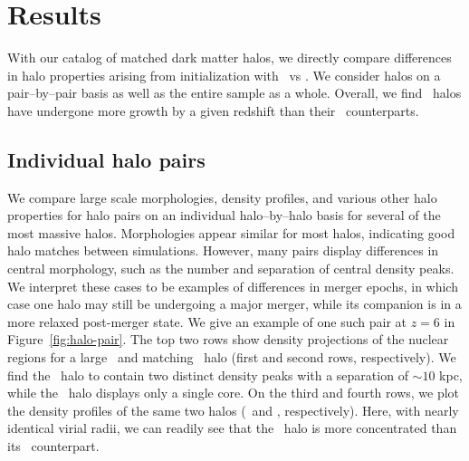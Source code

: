 
%
%

\section{Results}
\label{sec:2lpt--results}



With our catalog of matched dark matter halos, we directly compare differences in halo properties arising from initialization with \lpt\ vs \za.  We consider halos on a pair--by--pair basis as well as the entire sample as a whole.  Overall, we find \lpt\ halos have undergone more growth by a given redshift than their \za\ counterparts.




\subsection{Individual halo pairs}


We compare large scale morphologies, density profiles, and various other halo properties for halo pairs on an individual halo--by--halo basis for several of the most massive halos.  Morphologies appear similar for most halos, indicating good halo matches between simulations.  However, many pairs display differences in central morphology, such as the number and separation of central density peaks.  We interpret these cases to be examples of differences in merger epochs, in which case one halo may still be undergoing a major merger, while its companion is in a more relaxed post-merger state.  We give an example of one such pair at $z = 6$ in Figure~\ref{fig:halo-pair}.  The top two rows show density projections of the nuclear regions for a large \lpt\ and matching \za\ halo (first and second rows, respectively).  We find  the \za\ halo to contain two distinct density peaks with a separation of $\sim 10$ kpc, while the \lpt\ halo displays only a single core.  On the third and fourth rows, we plot the density profiles of the same two halos (\lpt\ and \za, respectively).  Here, with nearly identical virial radii, we can readily see that the \lpt\ halo is more concentrated than its \za\ counterpart.




